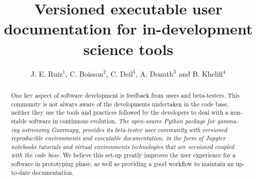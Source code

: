 \documentclass[11pt,twoside]{article}
\begin{document}
\title{Versioned executable user documentation for in-development science tools}

\author{J. E. Ruiz$^1$, C. Boisson$^2$, C. Deil$^3$, A. Donath$^3$ and B. Khelifi$^4$}




\begin{abstract}
One key aspect of software development is feedback from users and beta-testers. This community is not always aware of the
developments undertaken in the code base, neither they use the tools and practices followed by the developers to deal with
a non-stable software in continuous evolution.  \emph{The open-source Python package for gamma-ray astronomy Gammapy, provides 
its beta-tester user community with versioned reproducible environments and executable documentation, in the form of Jupyter
notebooks tutorials and virtual environments technologies that are versioned coupled with the code base.} We believe this 
set-up greatly improves the user experience for a software in prototyping phase, as well as providing a good workflow to
maintain an up-to-date documentation.
\end{abstract}

\end{document}
